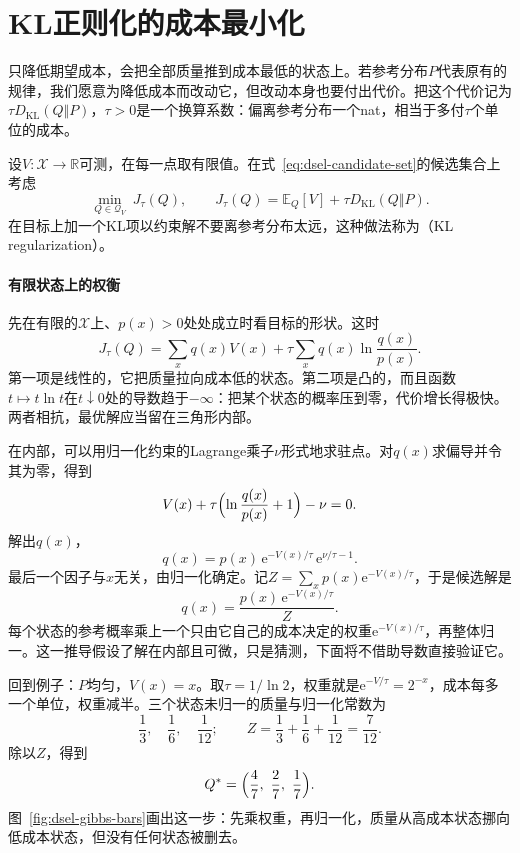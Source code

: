 \section{KL正则化的成本最小化}
\label{sec:dsel-kl-cost}

只降低期望成本，会把全部质量推到成本最低的状态上。若参考分布$P$代表原有的规律，我们愿意为降低成本而改动它，但改动本身也要付出代价。把这个代价记为$\tau D_{\mathrm{KL}}(Q\Vert P)$，$\tau>0$是一个换算系数：偏离参考分布一个nat，相当于多付$\tau$个单位的成本。

设$V:\mathcal{X}\to\mathbb{R}$可测，在每一点取有限值。在式~\eqref{eq:dsel-candidate-set}的候选集合上考虑
\begin{equation}
 \min_{Q\in\mathcal{Q}_V}\ J_\tau(Q),\qquad J_\tau(Q)=\mathbb{E}_{Q}[V]+\tau D_{\mathrm{KL}}(Q\Vert P).
 \label{eq:dsel-kl-cost-problem}
\end{equation}
在目标上加一个KL项以约束解不要离参考分布太远，这种做法称为（KL regularization）。

\paragraph{有限状态上的权衡}
先在有限的$\mathcal{X}$上、$p(x)>0$处处成立时看目标的形状。这时
\[
 J_\tau(Q)=\sum_{x}q(x)V(x)+\tau\sum_{x}q(x)\ln\frac{q(x)}{p(x)} .
\]
第一项是线性的，它把质量拉向成本低的状态。第二项是凸的，而且函数$t\mapsto t\ln t$在$t\downarrow0$处的导数趋于$-\infty$：把某个状态的概率压到零，代价增长得极快。两者相抗，最优解应当留在三角形内部。

在内部，可以用归一化约束的Lagrange乘子$\nu$形式地求驻点。对$q(x)$求偏导并令其为零，得到
\[
 V(x)+\tau\Bigl(\ln\frac{q(x)}{p(x)}+1\Bigr)-\nu=0 .
\]
解出$q(x)$，
\[
 q(x)=p(x)\,\mathrm{e}^{-V(x)/\tau}\,\mathrm{e}^{\nu/\tau-1} .
\]
最后一个因子与$x$无关，由归一化确定。记$Z=\sum_xp(x)\mathrm{e}^{-V(x)/\tau}$，于是候选解是
\[
 q(x)=\frac{p(x)\,\mathrm{e}^{-V(x)/\tau}}{Z} .
\]
每个状态的参考概率乘上一个只由它自己的成本决定的权重$\mathrm{e}^{-V(x)/\tau}$，再整体归一。这一推导假设了解在内部且可微，只是猜测，下面将不借助导数直接验证它。

回到例子：$P$均匀，$V(x)=x$。取$\tau=1/\ln2$，权重就是$\mathrm{e}^{-V/\tau}=2^{-x}$，成本每多一个单位，权重减半。三个状态未归一的质量与归一化常数为
\[
 \frac13,\quad\frac16,\quad\frac1{12};\qquad Z=\frac13+\frac16+\frac1{12}=\frac7{12} .
\]
除以$Z$，得到
\[
 Q^{*}=\Bigl(\frac47,\ \frac27,\ \frac17\Bigr).
\]
图~\ref{fig:dsel-gibbs-bars}画出这一步：先乘权重，再归一化，质量从高成本状态挪向低成本状态，但没有任何状态被删去。

